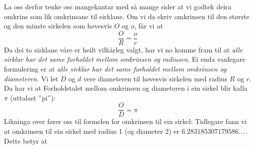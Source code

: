 {La oss derfor tenke oss mangekantar med så mange sider at vi godtek deira omkrins som lik omkrinsane til sirklane. Om vi da skriv omkrinsen til den største og den minste sirkelen som høvesvis $ O $ og $ o $, får vi at
\[ \frac{O}{R}=\frac{o}{r} \]
Da dei to sirklane våre er heilt vilkårleg valgt, har vi no komme fram til at \textit{alle sirklar har det same forholdet mellom omkrinsen og radiusen}. Ei enda vanlegare formulering er at \textit{alle sirklar har det same forholdet mellom omkrinsen og diameteren}. Vi let $ D $ og $ d $ vere diameteren til høvesvis sirkelen med radius $ R $ og $ r $. Da har vi at
Forholdstalet mellom omkrinsen og diameteren i ein sirkel blir kalla $ \pi $ \index{$ \pi $}(uttalast ''pi''):
\[ \frac{O}{D}=\pi \]
Likninga over fører oss til formelen for omkrinsen til ein sirkel:
Tidlegare fann vi at omkrinsen til ein sirkel med radius 1 (og diameter 2) er $ 6.283185307179586... $\,. Dette betyr at
} \vsk

\vsk

